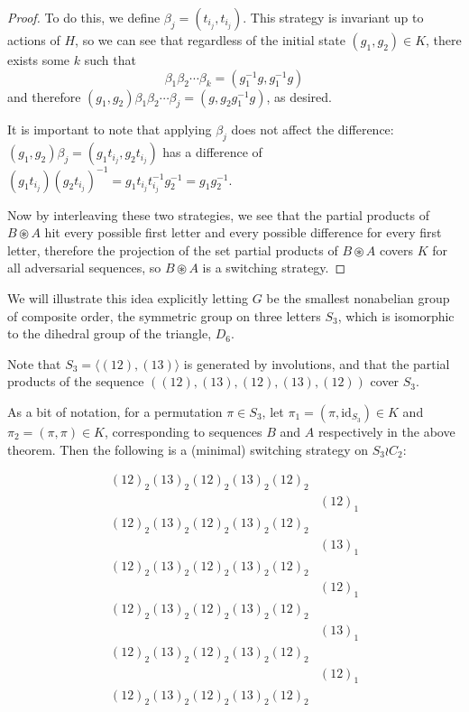 \begin{proof}
  To do this, we define $\beta_j = (t_{i_j}, t_{i_j})$. This strategy is
  invariant up to actions of $H$, so we can see that regardless of the initial
  state $(g_1, g_2) \in K$, there exists some $k$ such that
  \begin{equation}
    \beta_1 \beta_2 \cdots \beta_k = (g_1^{-1}g, g_1^{-1}g)
  \end{equation} and therefore
   $(g_1, g_2) \beta_1 \beta_2 \cdots \beta_j = (g, g_2g_1^{-1}g)$, as desired.

   It is important to note that applying $\beta_j$ does not affect the
   difference: $(g_1, g_2) \beta_j = (g_1t_{i_j}, g_2t_{i_j})$ has a
   difference of
   $(g_1t_{i_j})(g_2t_{i_j})^{-1} = g_1t_{i_j}t_{i_j}^{-1}g_2^{-1} = g_1g_2^{-1}$.

  Now by interleaving these two strategies, we see that the partial products
  of $B \circledast A$ hit every possible first letter and every possible
  difference for every first letter,
  therefore the projection of the set partial products of
  $B \circledast A$ covers $K$ for all adversarial sequences, so
  $B \circledast A$ is a switching strategy.
\end{proof}
We will illustrate this idea explicitly letting $G$ be the smallest nonabelian
group of composite order, the symmetric group on three letters $S_3$, which is
isomorphic to the dihedral group of the triangle, $D_6$.
\begin{example}
  Note that $S_3 = \langle(12), (13)\rangle$ is generated by involutions, and
  that the partial products of the sequence $((12),(13),(12),(13),(12))$
  cover $S_3$.

  As a bit of notation, for a permutation $\pi \in S_3$, let
  $\pi_1 = (\pi, \mathrm{id}_{S_3}) \in K$
  and
  $\pi_2 = (\pi, \pi) \in K$, corresponding to sequences $B$ and $A$
  respectively in the above theorem.
  Then the following is a (minimal) switching strategy on $S_3 \wr C_2$:
  \begin{singlespace}
  \begin{align*}
    (12)_2(13)_2(12)_2(13)_2(12)_2 \\
    &(12)_1 \\
    (12)_2(13)_2(12)_2(13)_2(12)_2 \\
    &(13)_1 \\
    (12)_2(13)_2(12)_2(13)_2(12)_2 \\
    &(12)_1 \\
    (12)_2(13)_2(12)_2(13)_2(12)_2 \\
    &(13)_1 \\
    (12)_2(13)_2(12)_2(13)_2(12)_2 \\
    &(12)_1 \\
    (12)_2(13)_2(12)_2(13)_2(12)_2
  \end{align*}
  \end{singlespace}
  \label{ex:TwoSymmetricGroups}
\end{example}
